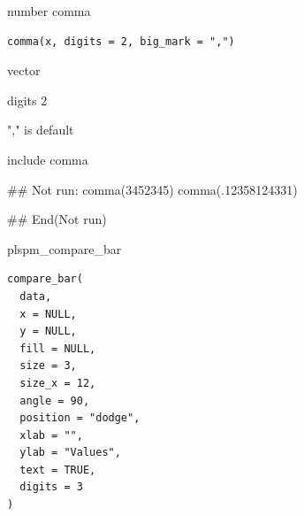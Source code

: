 \documentclass[a4paper]{book}
\begin{document}
%
\begin{Description}
number comma
\end{Description}
%
\begin{Usage}
\begin{verbatim}
comma(x, digits = 2, big_mark = ",")
\end{verbatim}
\end{Usage}
%
\begin{Arguments}
\begin{ldescription}
\item[\code{x}] vector

\item[\code{digits}] digits 2

\item[\code{big\_mark}] "," is default
\end{ldescription}
\end{Arguments}
%
\begin{Value}
include comma
\end{Value}
%
\begin{Examples}
\begin{ExampleCode}

## Not run: 
comma(3452345)
comma(.12358124331)

## End(Not run)
\end{ExampleCode}
\end{Examples}
%
\begin{Description}
plspm\_compare\_bar
\end{Description}
%
\begin{Usage}
\begin{verbatim}
compare_bar(
  data,
  x = NULL,
  y = NULL,
  fill = NULL,
  size = 3,
  size_x = 12,
  angle = 90,
  position = "dodge",
  xlab = "",
  ylab = "Values",
  text = TRUE,
  digits = 3
)
\end{verbatim}
\end{Usage}
%
\end{document}
